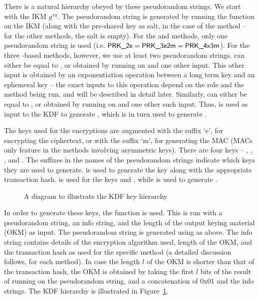{There is a natural hierarchy obeyed by these pseudorandom strings. We start with the IKM $g^{xy}$. The pseudorandom string \mPRKtwo is generated by running the \mHkdfExtract{} function on the IKM (along with the pre-shared key as salt, in the case of the \mPskPsk method -- for the other methods, the salt is empty). For the \mPskPsk and \mSigSig methods, only one pseudorandom string is used (i.e. $\text{\textup{\textsf{PRK\_2e}}} = \text{\textup{\textsf{PRK\_3e2m}}} = \text{\textup{\textsf{PRK\_4x3m}}}$). For the three \mStat-based methods, however, we use at least two pseudorandom strings. \mPRKthree can either be equal to \mPRKtwo, or obtained by running \mHkdfExtract{} on \mPRKtwo and one other input. This other input is obtained by an exponentiation operation between a long term key and an ephemeral key -- the exact inputs to this operation depend on the role and the method being run, and will be described in detail later. Similarly, \mPRKfour can either be equal to \mPRKthree, or obtained by running \mHkdfExtract{} on \mPRKthree and one other such input. Thus, \mPRKtwo is used as input to the KDF to generate \mPRKthree, which is in turn used to generate \mPRKfour.

The keys used for the \mAead{} encryptions are augmented with the suffix `e', for encrypting the ciphertext, or with the suffix `m', for generating the MAC (MACs only feature in the methods involving asymmetric keys). There are four keys -- \mKtwom, \mKtwoe, \mKthreem, and \mKthreeae. The suffixes in the names of the pseudorandom strings indicate which keys they are used to generate. \mPRKtwo is used to generate the key \mKtwoe along with the appropriate transaction hash. \mPRKthree is used for the keys \mKtwom and \mKthreeae, while \mPRKfour is used to generate \mKthreem.

\begin{figure}[htp]
\centering

\caption{A diagram to illustrate the KDF key hierarchy}
\label{fig:kdfdiagram}
\end{figure}

In order to generate these keys, the \mHkdfExpand{} function is used. This is run with a pseudorandom string, an info string, and the length of the output keying material (OKM) as input. The pseudorandom string is generated using \mHkdfExtract{} as above. The info string contains details of the \mAead{} encryption algorithm used, length of the OKM, and the transaction hash as used for the specific method (a detailed discussion follows, for each method). In case the length $l$ of the OKM is shorter than that of the transaction hash, the OKM is obtained by taking the first $l$ bits of the result of running \mHmac{} on the pseudorandom string, and a concatenation of 0x01 and the info strings. The KDF hierarchy is illustrated in Figure~\ref{fig:kdfdiagram}.



}
